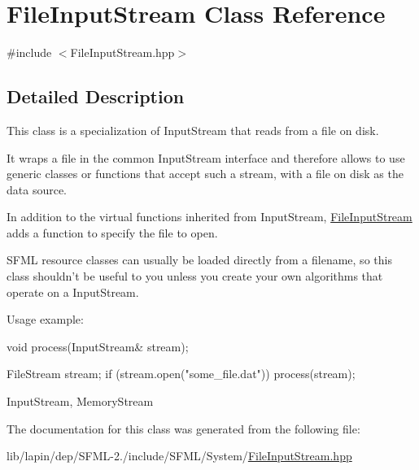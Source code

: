 \hypertarget{class_file_input_stream}{\section{File\-Input\-Stream Class Reference}
\label{class_file_input_stream}
}


{\ttfamily \#include $<$File\-Input\-Stream.\-hpp$>$}



\subsection{Detailed Description}
This class is a specialization of Input\-Stream that reads from a file on disk.

It wraps a file in the common Input\-Stream interface and therefore allows to use generic classes or functions that accept such a stream, with a file on disk as the data source.

In addition to the virtual functions inherited from Input\-Stream, \hyperlink{class_file_input_stream}{File\-Input\-Stream} adds a function to specify the file to open.

S\-F\-M\-L resource classes can usually be loaded directly from a filename, so this class shouldn't be useful to you unless you create your own algorithms that operate on a Input\-Stream.

Usage example\-: 
\begin{DoxyCode}
\textcolor{keywordtype}{void} process(InputStream& stream);

FileStream stream;
\textcolor{keywordflow}{if} (stream.open(\textcolor{stringliteral}{"some\_file.dat"}))
   process(stream);
\end{DoxyCode}


Input\-Stream, Memory\-Stream 

The documentation for this class was generated from the following file\-:\begin{DoxyCompactItemize}
\item 
lib/lapin/dep/\-S\-F\-M\-L-\/2./include/\-S\-F\-M\-L/\-System/\hyperlink{lapin_2dep_2_s_f_m_l-2_83_2include_2_s_f_m_l_2_system_2_file_input_stream_8hpp}{File\-Input\-Stream.\-hpp}\end{DoxyCompactItemize}
